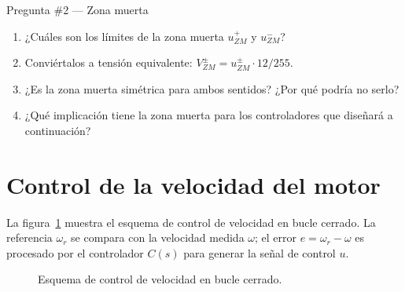 \documentclass[12pt,a4paper]{article}
\begin{document}
\begin{pregunta}{Pregunta \#2 — Zona muerta}
  \begin{enumerate}[label=\alph*)]
    \item ¿Cuáles son los límites de la zona muerta
          $u_{ZM}^{+}$ y $u_{ZM}^{-}$?
    \item Conviértalos a tensión equivalente: $V_{ZM}^{\pm}=u_{ZM}^{\pm}\cdot12/255$.
    \item ¿Es la zona muerta simétrica para ambos sentidos? ¿Por qué podría no serlo?
    \item ¿Qué implicación tiene la zona muerta para los controladores que diseñará
          a continuación?
  \end{enumerate}
\end{pregunta}

\section{Control de la velocidad del motor}

La figura~\ref{fig:vel_loop} muestra el esquema de control de velocidad en bucle
cerrado. La referencia $\omega_r$ se compara con la velocidad medida $\omega$;
el error $e=\omega_r-\omega$ es procesado por el controlador $C(s)$ para generar
la señal de control $u$.

\begin{figure}[H]
\centering
{}
\caption{Esquema de control de velocidad en bucle cerrado.}
\label{fig:vel_loop}
\end{figure}
\end{document}
